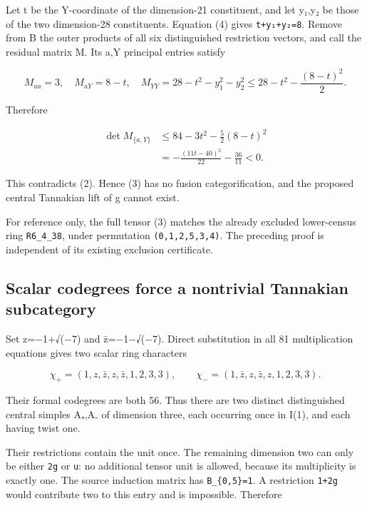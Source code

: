 Let t be the Y-coordinate of the dimension-21 constituent, and let y₁,y₂
be those of the two dimension-28 constituents. Equation (4) gives
\texttt{t+y₁+y\allowbreak{}₂=8}. Remove from B the outer products of all
six distinguished restriction vectors, and call the residual matrix M.
Its a,Y principal entries satisfy

\[
M_{aa}=3,\quad M_{aY}=8-t,\quad
M_{YY}=28-t^2-y_1^2-y_2^2\le28-t^2-\frac{(8-t)^2}{2}.
\]

Therefore

\[
\begin{aligned}
\det M_{\{a,Y\}}
&\le84-3t^2-\frac52(8-t)^2\\
&=-\frac{(11t-40)^2}{22}-\frac{36}{11}<0.
\end{aligned}
\]

This contradicts (2). Hence (3) has no fusion categorification, and the
proposed central Tannakian lift of g cannot exist.

For reference only, the full tensor (3) matches the already excluded
lower-census ring \texttt{R6\_\allowbreak{}4\_\allowbreak{}38}, under
permutation \texttt{(0,1,2\allowbreak{},5,3,4\allowbreak{})}. The
preceding proof is independent of its existing exclusion certificate.

\hypertarget{scalar-codegrees-force-a-nontrivial-tannakian-subcategory}{%
\subsection{Scalar codegrees force a nontrivial Tannakian
subcategory}\label{scalar-codegrees-force-a-nontrivial-tannakian-subcategory}}

Set z=−1+√(−7) and z̄=−1−√(−7). Direct substitution in all 81
multiplication equations gives two scalar ring characters

\[
\chi_+=(1,z,\bar z,z,\bar z,1,2,3,3),\qquad
\chi_-=(1,\bar z,z,\bar z,z,1,2,3,3).
\]

Their formal codegrees are both 56. Thus there are two distinct
distinguished central simples A₊,A₋ of dimension three, each occurring
once in I(1), and each having twist one.

Their restrictions contain the unit once. The remaining dimension two
can only be either \texttt{2g} or \texttt{u}: no additional tensor unit
is allowed, because its multiplicity is exactly one. The source
induction matrix has \texttt{B\_\allowbreak{}\{0,5\}=\allowbreak{}1}. A
restriction \texttt{1+2g} would contribute two to this entry and is
impossible. Therefore


